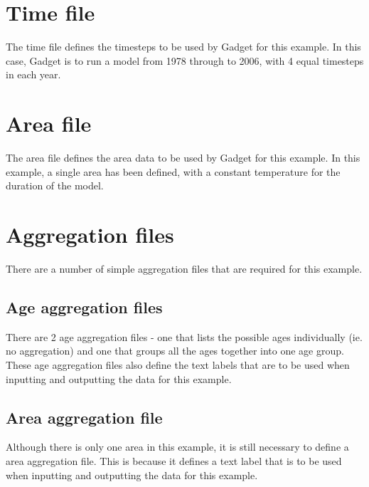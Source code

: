 \documentclass[10pt,titlepage]{article}
\begin{document}
\section{Time file}

The time file defines the timesteps to be used by Gadget for this example.  In this case, Gadget is to run a model from 1978 through to 2006, with 4 equal timesteps in each year.

{\small }

\section{Area file}

The area file defines the area data to be used by Gadget for this example.  In this example, a single area has been defined, with a constant temperature for the duration of the model.

{\small }

\section{Aggregation files}

There are a number of simple aggregation files that are required for this example.

\subsection{Age aggregation files}

There are 2 age aggregation files - one that lists the possible ages individually (ie. no aggregation) and one that groups all the ages together into one age group.  These age aggregation files also define the text labels that are to be used when inputting and outputting the data for this example.

{\small }
{\small }

\subsection{Area aggregation file}

Although there is only one area in this example, it is still necessary to define a area aggregation file.  This is because it defines a text label that is to be used when inputting and outputting the data for this example.

{\small }
\end{document}
